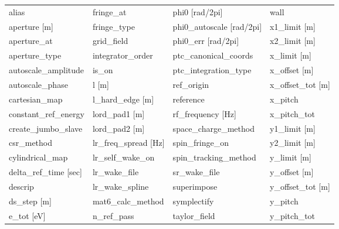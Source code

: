  \begin{tabular}{llll} \toprule
alias                          & fringe_at                      & phi0 [rad/2pi]                 & wall                           \\
aperture [m]                   & fringe_type                    & phi0_autoscale [rad/2pi]       & x1_limit [m]                   \\
aperture_at                    & grid_field                     & phi0_err [rad/2pi]             & x2_limit [m]                   \\
aperture_type                  & integrator_order               & ptc_canonical_coords           & x_limit [m]                    \\
autoscale_amplitude            & is_on                          & ptc_integration_type           & x_offset [m]                   \\
autoscale_phase                & l [m]                          & ref_origin                     & x_offset_tot [m]               \\
cartesian_map                  & l_hard_edge [m]                & reference                      & x_pitch                        \\
constant_ref_energy            & lord_pad1 [m]                  & rf_frequency [Hz]              & x_pitch_tot                    \\
create_jumbo_slave             & lord_pad2 [m]                  & space_charge_method            & y1_limit [m]                   \\
csr_method                     & lr_freq_spread [Hz]            & spin_fringe_on                 & y2_limit [m]                   \\
cylindrical_map                & lr_self_wake_on                & spin_tracking_method           & y_limit [m]                    \\
delta_ref_time [sec]           & lr_wake_file                   & sr_wake_file                   & y_offset [m]                   \\
descrip                        & lr_wake_spline                 & superimpose                    & y_offset_tot [m]               \\
ds_step [m]                    & mat6_calc_method               & symplectify                    & y_pitch                        \\
e_tot [eV]                     & n_ref_pass                     & taylor_field                   & y_pitch_tot                    \\

\end{tabular}
